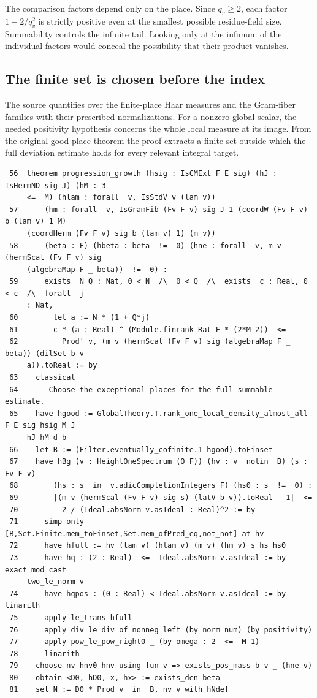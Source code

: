 \documentclass[12pt,letterpaper]{article}
\begin{document}
The comparison factors depend only on the place. Since $q_v\ge2$, each factor $1-2/q_v^2$ is strictly positive even at the smallest possible residue-field size. Summability controls the infinite tail. Looking only at the infimum of the individual factors would conceal the possibility that their product vanishes.
\clearpage{}\subsection*{The finite set is chosen before the index}\label{extract-ProgressionGrowth56}
The source quantifies over the finite-place Haar measures and the Gram-fiber families with their prescribed normalizations. For a nonzero global scalar, the needed positivity hypothesis concerns the whole local measure at its image. From the original good-place theorem the proof extracts a finite set outside which the full deviation estimate holds for every relevant integral target.
\par
{\fontsize{9.2}{11.2}\selectfont\begin{verbatim}
 56  theorem progression_growth (hsig : IsCMExt F E sig) (hJ : IsHermND sig J) (hM : 3
     <=  M) (hlam : forall  v, IsStdV v (lam v))
 57      (hm : forall  v, IsGramFib (Fv F v) sig J 1 (coordW (Fv F v) b (lam v) 1 M)
     (coordHerm (Fv F v) sig b (lam v) 1) (m v))
 58      (beta : F) (hbeta : beta  !=  0) (hne : forall  v, m v (hermScal (Fv F v) sig
     (algebraMap F _ beta))  !=  0) :
 59      exists  N Q : Nat, 0 < N  /\  0 < Q  /\  exists  c : Real, 0 < c  /\  forall  j
     : Nat,
 60        let a := N * (1 + Q*j)
 61        c * (a : Real) ^ (Module.finrank Rat F * (2*M-2))  <=
 62          Prod' v, (m v (hermScal (Fv F v) sig (algebraMap F _ beta)) (dilSet b v
     a)).toReal := by
 63    classical
 64    -- Choose the exceptional places for the full summable estimate.
 65    have hgood := GlobalTheory.T.rank_one_local_density_almost_all F E sig hsig M J
     hJ hM d b
 66    let B := (Filter.eventually_cofinite.1 hgood).toFinset
 67    have hBg (v : HeightOneSpectrum (O F)) (hv : v  notin  B) (s : Fv F v)
 68        (hs : s  in  v.adicCompletionIntegers F) (hs0 : s  !=  0) :
 69        |(m v (hermScal (Fv F v) sig s) (latV b v)).toReal - 1|  <=
 70          2 / (Ideal.absNorm v.asIdeal : Real)^2 := by
 71      simp only [B,Set.Finite.mem_toFinset,Set.mem_ofPred_eq,not_not] at hv
 72      have hfull := hv (lam v) (hlam v) (m v) (hm v) s hs hs0
 73      have hq : (2 : Real)  <=  Ideal.absNorm v.asIdeal := by exact_mod_cast
     two_le_norm v
 74      have hqpos : (0 : Real) < Ideal.absNorm v.asIdeal := by linarith
 75      apply le_trans hfull
 76      apply div_le_div_of_nonneg_left (by norm_num) (by positivity)
 77      apply pow_le_pow_right0 _ (by omega : 2  <=  M-1)
 78      linarith
 79    choose nv hnv0 hnv using fun v => exists_pos_mass b v _ (hne v)
 80    obtain <D0, hD0, x, hx> := exists_den beta
 81    set N := D0 * Prod v  in  B, nv v with hNdef
\end{verbatim}}
\end{document}
